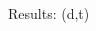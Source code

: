 \documentclass[aspectratio=43, dvipsnames]{beamer}
\newcommand{\iso}[2]{\ce{^{#1}#2}}
\begin{document}
\begin{frame}{Results: \iso{20}{O}(d,t)}
{\begin{columns}[c]
\begin{column}{0.6\linewidth}
    \end{column}%
    \begin{column}{0.4\linewidth}
    \\ 
    \end{column}
    \end{columns}
  }
\end{frame}
\end{document}
